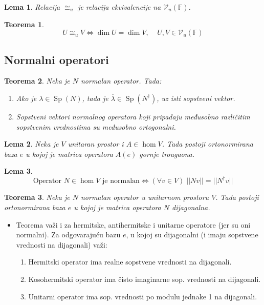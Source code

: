 \documentclass[a4paper,12pt,twoside]{report}
\newtheorem{theorem}{Teorema}[section]
\newtheorem{lemma}{Lema}[section]
\numberwithin{algorithm}{section}
\begin{document}
\begin{lemma}
    Relacija $\cong_u$ je relacija ekvivalencije na $\mathcal{V}_u(\mathbb{F})$.
\end{lemma}

\begin{theorem}
    \[ U \cong_u V \iff \dim U = \dim V, \;\;\;\; U,V \in  \mathcal{V}_u(\mathbb{F})\]
\end{theorem}

\subsection{Normalni operatori}
\label{normalniOperatori}
\begin{theorem}
    Neka je $N$ normalan operator. Tada:
    \begin{enumerate}
        \item Ako je $\lambda \in \operatorname{Sp}(N)$, tada je $\overline{\lambda} \in \operatorname{Sp}(N^\dagger)$, uz isti sopstveni vektor.
        \item Sopstveni vektori normalnog operatora koji pripadaju međusobno različitim sopstvenim vrednostima su međusobno ortogonalni.
    \end{enumerate}
\end{theorem}

\begin{lemma}
    Neka je $V$ unitaran prostor i $A \in \hom V$. Tada postoji ortonormirana baza $e$ u kojoj je matrica operatora $A(e)$ gornje trougaona.
\end{lemma}

\begin{lemma}
    \[ \text{Operator } N \in \hom V \text{ je normalan} \iff (\forall v \in V)\; ||Nv|| = ||N^\dagger v|| \]
\end{lemma}

\begin{theorem}
    Neka je $N$ normalan operator u unitarnom prostoru $V$. Tada postoji ortonormirana baza $e$ u kojoj je matrica operatora $N$ dijagonalna.
\end{theorem}

\begin{itemize}
    \item Teorema važi i za hermitske, antihermitske i unitarne operatore (jer su oni normalni). Za odgovarajuću bazu $e$, u kojoj su dijagonalni (i imaju sopstvene vrednosti na dijagonali) važi:
    \begin{enumerate}
        \item Hermitski operator ima realne sopstvene vrednosti na dijagonali.
        \item Kosohermitski operator ima čisto imaginarne sop. vrednosti na dijagonali.
        \item Unitarni operator ima sop. vrednosti po modulu jednake 1 na dijagonali.
    \end{enumerate}
\end{itemize}
\end{document}
